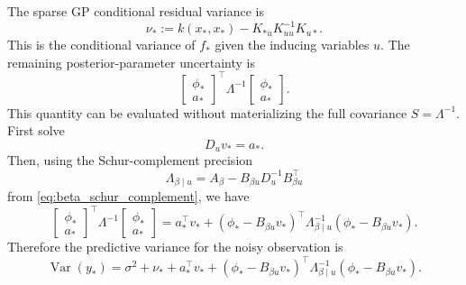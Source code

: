 \documentclass[12pt]{article}
\newcommand{\Var}{\operatorname{Var}}
\begin{document}
The sparse GP conditional residual variance is
\begin{equation}
    \nu_*
    :=
    k(x_*,x_*)-K_{*u}K_{uu}^{-1}K_{u*}.
    \label{eq:sparse_conditional_residual_variance}
\end{equation}
This is the conditional variance of \(f_*\) given the inducing variables \(u\).
The remaining posterior-parameter uncertainty is
\begin{equation}
    \begin{bmatrix}\phi_*\\a_*\end{bmatrix}^{\!\top}
    \Lambda^{-1}
    \begin{bmatrix}\phi_*\\a_*\end{bmatrix}.
\end{equation}
This quantity can be evaluated without materializing the full covariance
\(S=\Lambda^{-1}\).  First solve
\begin{equation}
    D_uv_*=a_* .
    \label{eq:prediction_du_solve}
\end{equation}
Then, using the Schur-complement precision
\[
    \Lambda_{\beta\mid u}
    =
    A_\beta-B_{\beta u}D_u^{-1}B_{\beta u}^\top
\]
from \eqref{eq:beta_schur_complement}, we have
\begin{equation}
    \begin{bmatrix}\phi_*\\a_*\end{bmatrix}^{\!\top}
    \Lambda^{-1}
    \begin{bmatrix}\phi_*\\a_*\end{bmatrix}
    =
    a_*^\top v_*
    +
    \left(\phi_*-B_{\beta u}v_*\right)^\top
    \Lambda_{\beta\mid u}^{-1}
    \left(\phi_*-B_{\beta u}v_*\right).
    \label{eq:structured_predictive_quadratic}
\end{equation}
Therefore the predictive variance for the noisy observation is
\begin{equation}
    \Var(y_*)
    =
    \sigma^2+
    \nu_*+
    a_*^\top v_*
    +
    \left(\phi_*-B_{\beta u}v_*\right)^\top
    \Lambda_{\beta\mid u}^{-1}
    \left(\phi_*-B_{\beta u}v_*\right).
    \label{eq:structured_predictive_variance}
\end{equation}
\end{document}
